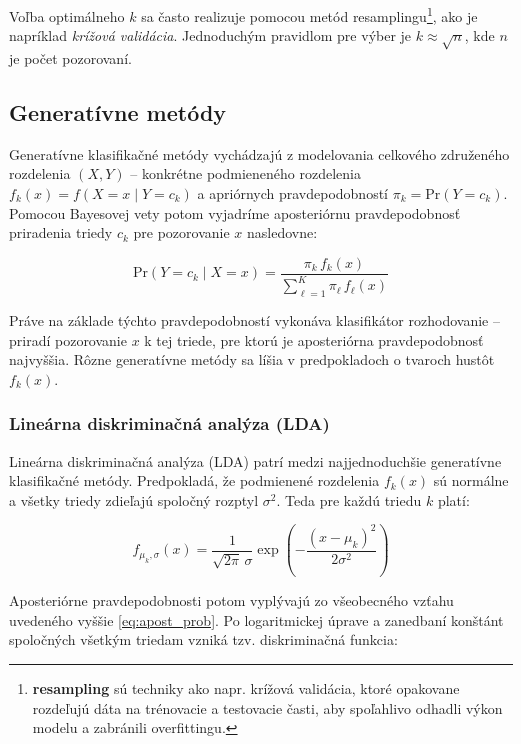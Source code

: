 Voľba optimálneho $k$ sa často realizuje pomocou metód resamplingu\footnote{\textbf{resampling} sú techniky ako napr. krížová validácia, ktoré opakovane rozdeľujú dáta na trénovacie a testovacie časti, aby spoľahlivo odhadli výkon modelu a zabránili overfittingu.}, ako je napríklad \textit{krížová validácia}. Jednoduchým pravidlom pre výber je $k \approx \sqrt{n}$, kde $n$ je počet pozorovaní.

\subsection{Generatívne metódy}
\label{subsec:gener_methods}

Generatívne klasifikačné metódy vychádzajú z modelovania celkového združeného rozdelenia $(X, Y)$ – konkrétne podmieneného rozdelenia $f_k(x) = f(X = x \mid Y = c_k)$ a apriórnych pravdepodobností $\pi_k = \mathrm{Pr}(Y = c_k)$. Pomocou Bayesovej vety potom vyjadríme aposteriórnu pravdepodobnosť priradenia triedy $c_k$ pre pozorovanie $x$ nasledovne:

\begin{equation}\label{eq:apost_prob}
\mathrm{Pr}(Y = c_k \mid X = x) = \frac{\pi_k \, f_k(x)}{\sum\limits_{\ell = 1}^{K} \pi_\ell \, f_\ell(x)}
\end{equation}

Práve na základe týchto pravdepodobností vykonáva klasifikátor rozhodovanie – priradí pozorovanie $x$ k tej triede, pre ktorú je aposteriórna pravdepodobnosť najvyššia. Rôzne generatívne metódy sa líšia v predpokladoch o tvaroch hustôt $f_k(x)$.

\subsubsection{Lineárna diskriminačná analýza (LDA)}
\label{subsubsec:lda}

Lineárna diskriminačná analýza (LDA) patrí medzi najjednoduchšie generatívne klasifikačné metódy. Predpokladá, že podmienené rozdelenia $f_k(x)$ sú normálne a všetky triedy zdieľajú spoločný rozptyl $\sigma^2$. Teda pre každú triedu $k$ platí:

\begin{equation}
f_{\mu_k,\sigma}(x) = \frac{1}{\sqrt{2\pi} \, \sigma} \exp\left( -\frac{(x - \mu_k)^2}{2\sigma^2} \right)
\end{equation}

Aposteriórne pravdepodobnosti potom vyplývajú zo všeobecného vzťahu uvedeného vyššie \eqref{eq:apost_prob}. Po logaritmickej úprave a zanedbaní konštánt spoločných všetkým triedam vzniká tzv. diskriminačná funkcia:


